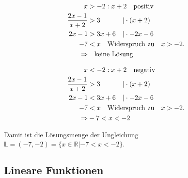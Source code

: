 \begin{minipage}{0.45\textwidth}
    \begin{align*}
        x &> -2: x+2 \qq{positiv}\\
        \frac{2x-1}{x+2} &> 3\hphantom{x+6} \quad |\cdot (x+2) \\
        2x-1 &> 3x+6  \quad |\cdot -2x-6 \\
        -7 &< x   \qq{Widerspruch zu} x > -2. \\
        \Rightarrow & \qq{keine Lösung}
    \end{align*}
\end{minipage}
\hfill\vline\hfill
\begin{minipage}{0.45\textwidth}
    \begin{align*}
        x &< -2: x+2 \qq{negativ}\\
        \frac{2x-1}{x+2} &> 3\hphantom{x+6} \quad |\cdot (x+2) \\
        2x-1 &< 3x+6  \quad |\cdot -2x-6 \\
        -7 &< x   \qq{Widerspruch zu} x > -2. \\
        \Rightarrow & -7 < x < -2
    \end{align*}
\end{minipage}

Damit ist die Lösungsmenge der Ungleichung $\mathbb{L} = (-7,-2) = \{x\in \mathbb{R}|-7 < x<-2\}$.

\newpage
\subsection{Lineare Funktionen} 

